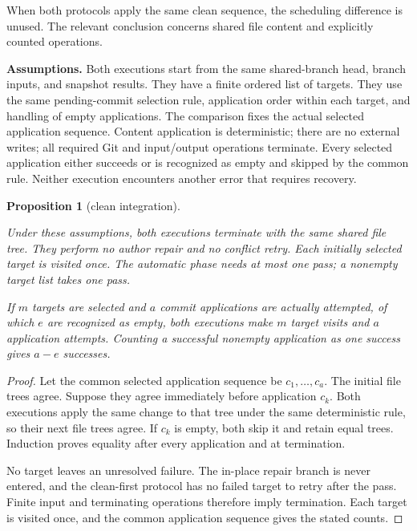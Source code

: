 \documentclass[pdflatex,sn-mathphys-ay]{sn-jnl}
\theoremstyle{thmstyleone}
\newtheorem{proposition}[theorem]{Proposition}
\theoremstyle{thmstylethree}
\begin{document}
\begin{appendices}
When both protocols apply the same clean sequence, the scheduling difference is unused. The relevant conclusion concerns shared file content and explicitly counted operations.

\textbf{Assumptions.} Both executions start from the same shared-branch head, branch inputs, and snapshot results. They have a finite ordered list of targets. They use the same pending-commit selection rule, application order within each target, and handling of empty applications. The comparison fixes the actual selected application sequence. Content application is deterministic; there are no external writes; all required Git and input/output operations terminate. Every selected application either succeeds or is recognized as empty and skipped by the common rule. Neither execution encounters another error that requires recovery.

\begin{proposition}[clean integration]\label{prop:clean-integration}

Under these assumptions, both executions terminate with the same shared file tree. They perform no author repair and no conflict retry. Each initially selected target is visited once. The automatic phase needs at most one pass; a nonempty target list takes one pass.

If \(m\) targets are selected and \(a\) commit applications are actually attempted, of which \(e\) are recognized as empty, both executions make \(m\) target visits and \(a\) application attempts. Counting a successful nonempty application as one success gives \(a-e\) successes.

\end{proposition}
\begin{proof}

Let the common selected application sequence be \(c_1,\ldots,c_a\). The initial file trees agree. Suppose they agree immediately before application \(c_k\). Both executions apply the same change to that tree under the same deterministic rule, so their next file trees agree. If \(c_k\) is empty, both skip it and retain equal trees. Induction proves equality after every application and at termination.

No target leaves an unresolved failure. The in-place repair branch is never entered, and the clean-first protocol has no failed target to retry after the pass. Finite input and terminating operations therefore imply termination. Each target is visited once, and the common application sequence gives the stated counts.


\end{proof}
\end{appendices}
\end{document}
